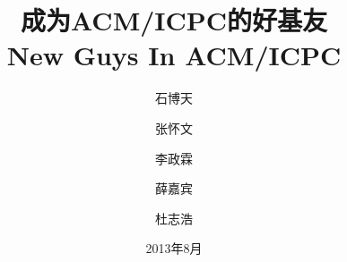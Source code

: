 \title{成为ACM/ICPC的好基友\\New Guys In ACM/ICPC}
\author{石博天 \and 张怀文 \and 李政霖 \and 薛嘉宾 \and 杜志浩 }
\date{2013年8月}
\maketitle